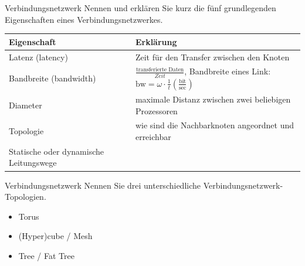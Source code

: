 \begin{aufgabe}{Verbindungsnetzwerk}
    Nennen und erklären Sie kurz die fünf grundlegenden Eigenschaften eines Verbindungsnetzwerkes.
    \tcblower
    \begin{tabularx}{\textwidth}{|X|X|}
        \toprule
        Eigenschaft            & Erklärung                                                                                                                                                    \\
        \midrule
        Latenz (latency)       & Zeit für den Transfer zwischen den Knoten                                                                                                                    \\
        \midrule
        Bandbreite (bandwidth) & $\frac{\text{transferierte Daten}}{Zeit}$, \newline Bandbreite eines Link: $\text{bw} = \omega \cdot \frac{1}{t} \left(\frac{\text{bit}}{\text{sec}}\right)$ \\
        \midrule
        Diameter               & maximale Distanz zwischen zwei beliebigen Prozessoren                                                                                                        \\
        \midrule
        Topologie              & wie sind die Nachbarknoten angeordnet und erreichbar                                                                                                         \\
        \midrule
        Statische oder \newline dynamische Leitungswege                                                                                                                                       \\
        \bottomrule
    \end{tabularx}
\end{aufgabe}

\begin{aufgabe}{Verbindungsnetzwerk}
    Nennen Sie drei unterschiedliche Verbindungsnetzwerk-Topologien.
    \tcblower
    \begin{itemize}
        \item Torus
        \item (Hyper)cube / Mesh
        \item Tree / Fat Tree
    \end{itemize}
\end{aufgabe}

